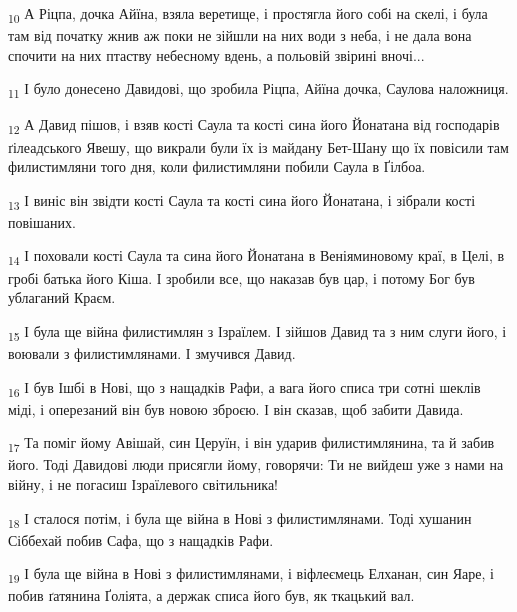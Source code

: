 \begin{tcolorbox}
\textsubscript{10} А Ріцпа, дочка Айїна, взяла веретище, і простягла його собі на скелі, і була там від початку жнив аж поки не зійшли на них води з неба, і не дала вона спочити на них птаству небесному вдень, а польовій звірині вночі...
\end{tcolorbox}
\begin{tcolorbox}
\textsubscript{11} І було донесено Давидові, що зробила Ріцпа, Айїна дочка, Саулова наложниця.
\end{tcolorbox}
\begin{tcolorbox}
\textsubscript{12} А Давид пішов, і взяв кості Саула та кості сина його Йонатана від господарів ґілеадського Явешу, що викрали були їх із майдану Бет-Шану що їх повісили там филистимляни того дня, коли филистимляни побили Саула в Ґілбоа.
\end{tcolorbox}
\begin{tcolorbox}
\textsubscript{13} І виніс він звідти кості Саула та кості сина його Йонатана, і зібрали кості повішаних.
\end{tcolorbox}
\begin{tcolorbox}
\textsubscript{14} І поховали кості Саула та сина його Йонатана в Веніяминовому краї, в Целі, в гробі батька його Кіша. І зробили все, що наказав був цар, і потому Бог був ублаганий Краєм.
\end{tcolorbox}
\begin{tcolorbox}
\textsubscript{15} І була ще війна филистимлян з Ізраїлем. І зійшов Давид та з ним слуги його, і воювали з филистимлянами. І змучився Давид.
\end{tcolorbox}
\begin{tcolorbox}
\textsubscript{16} І був Ішбі в Нові, що з нащадків Рафи, а вага його списа три сотні шеклів міді, і оперезаний він був новою зброєю. І він сказав, щоб забити Давида.
\end{tcolorbox}
\begin{tcolorbox}
\textsubscript{17} Та поміг йому Авішай, син Церуїн, і він ударив филистимлянина, та й забив його. Тоді Давидові люди присягли йому, говорячи: Ти не вийдеш уже з нами на війну, і не погасиш Ізраїлевого світильника!
\end{tcolorbox}
\begin{tcolorbox}
\textsubscript{18} І сталося потім, і була ще війна в Нові з филистимлянами. Тоді хушанин Сіббехай побив Сафа, що з нащадків Рафи.
\end{tcolorbox}
\begin{tcolorbox}
\textsubscript{19} І була ще війна в Нові з филистимлянами, і віфлеємець Елханан, син Яаре, і побив ґатянина Ґоліята, а держак списа його був, як ткацький вал.
\end{tcolorbox}
